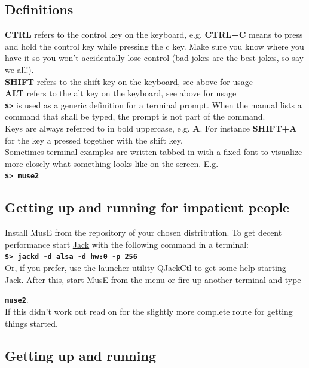 \documentclass[a4paper]{report}
\newcommand{\key}[1]{\textbf{#1}}
\newcommand{\shell}[1]{\texttt{\textbf{#1}}}
\begin{document}
\subsection{Definitions}
\key{CTRL} refers to the control key on the keyboard, e.g. \key{CTRL+C}
means to press and hold the control key while pressing the c key. Make sure
you know where you have it so you won't accidentally lose control
(bad jokes are the best jokes, so say we all!).\\
\key{SHIFT} refers to the shift key on the keyboard, see above for usage\\
\key{ALT} refers to the alt key on the keyboard, see above for usage\\
\shell{\$>} is used as a generic definition for a terminal prompt. When the
manual lists a command that shall be typed, the prompt is not part of the
command.\\
Keys are always referred to in bold uppercase, e.g. \key{A}. For instance
\key{SHIFT+A} for the key a pressed together with the shift key.\\
Sometimes terminal examples are written tabbed in with a fixed font to
visualize more closely what something looks like on the screen.
E.g.\\
\hspace*{1cm}\shell{\$> muse2}\\

\subsection{Getting up and running for impatient people}
Install MusE from the repository of your chosen distribution.
To get decent performance start \href{http://jackaudio.org/}{Jack} with
the following command in a terminal:\\
\hspace*{1cm}\shell{\$> jackd -d alsa -d hw:0 -p 256}\\
Or, if you prefer, use the launcher utility 
\href{http://qjackctl.sourceforge.net/}{QJackCtl} to get some
help starting Jack.
After this, start MusE from the menu or fire up another terminal and
type

\shell{muse2}.\\
If this didn't work out read on for the slightly more complete route for
getting things started.

\subsection{Getting up and running}
\end{document}

